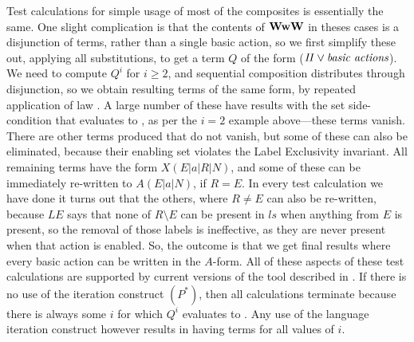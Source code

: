 Test calculations for simple usage of most of the composites is essentially the
same.
One slight complication is that the contents of $\mathbf{WwW}$ in theses cases
is a disjunction of terms, rather than a single basic action,
so we first simplify these out, applying all substitutions,
to get a term $Q$ of the form ($\mathit{II} \lor \textit{basic actions}$).
We need to compute $Q^i$ for $i \geq 2$,
and sequential composition distributes through disjunction,
so we obtain resulting terms of the same form,
by repeated application of law .
A large number of these have results
with the set side-condition that evaluates to \false,
as per the $i=2$ example above---these terms vanish.
There are other terms produced that do not vanish,
but some of these can also be eliminated,
because their enabling set violates the Label Exclusivity invariant.
All remaining terms have the form $X(E|a|R|N)$,
and some of these can be immediately re-written to $A(E|a|N)$,
if $R=E$.
In every test calculation we have done
it turns out that the others, where $R\neq E$ can also be re-written,
because $LE$ says that none of $R \setminus E$ can be present in $ls$
when anything from $E$ is present,
so the removal of those labels is ineffective, as they are never present
when that action is enabled.
So, the outcome is that we get final results where every basic action
can be written in the $A$-form.
All of these aspects of these test calculations are supported by current
versions of the tool described in \cite{DBLP:conf/utp/Butterfield16}.
If there is no use of the iteration construct $(P^*)$,
then all calculations terminate because
there is always some $i$ for which $Q^i$ evaluates to \false.
Any use of the language iteration construct however
results in having terms for all values of $i$.

